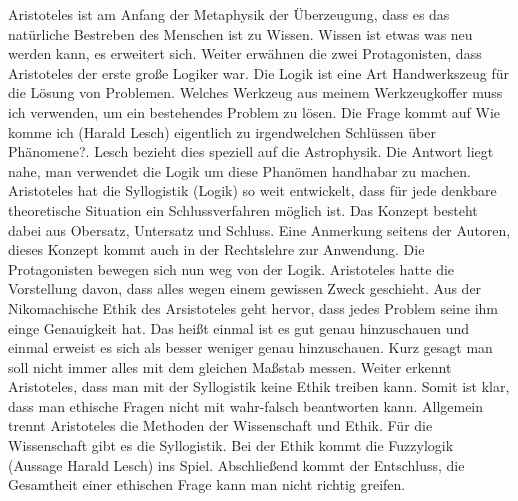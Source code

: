 Aristoteles ist am Anfang der Metaphysik der Überzeugung, dass es das natürliche Bestreben des Menschen ist zu Wissen. Wissen ist etwas was neu werden kann, es erweitert sich. Weiter erwähnen die zwei Protagonisten, dass Aristoteles der erste große Logiker war. Die Logik ist eine Art Handwerkszeug für die Lösung von Problemen. Welches Werkzeug aus meinem Werkzeugkoffer muss ich verwenden, um ein bestehendes Problem zu lösen. Die Frage kommt auf \glqq Wie komme ich (Harald Lesch) eigentlich zu irgendwelchen Schlüssen über Phänomene?\grqq. Lesch bezieht dies speziell auf die Astrophysik. Die Antwort liegt nahe, man verwendet die Logik um diese Phanömen handhabar zu machen. Aristoteles hat die Syllogistik (Logik) so weit entwickelt, dass für jede denkbare theoretische Situation ein Schlussverfahren möglich ist. Das Konzept besteht dabei aus Obersatz, Untersatz und Schluss. Eine Anmerkung seitens der Autoren, dieses Konzept kommt auch in der Rechtslehre zur Anwendung. Die Protagonisten bewegen sich nun weg von der Logik. Aristoteles hatte die Vorstellung davon, dass alles wegen einem gewissen Zweck geschieht. Aus der Nikomachische Ethik des Arsistoteles geht hervor, dass jedes Problem seine ihm einge Genauigkeit hat. Das heißt einmal ist es gut genau hinzuschauen und einmal erweist es sich als besser weniger genau hinzuschauen. Kurz gesagt man soll nicht immer alles mit dem gleichen Maßstab messen. Weiter erkennt Aristoteles, dass man mit der Syllogistik keine Ethik treiben kann. Somit ist klar, dass man ethische Fragen nicht mit wahr-falsch beantworten kann. Allgemein trennt Aristoteles die Methoden der Wissenschaft und Ethik. Für die Wissenschaft gibt es die Syllogistik. Bei der Ethik kommt die Fuzzylogik (Aussage Harald Lesch) ins Spiel. Abschließend kommt der Entschluss, die Gesamtheit einer ethischen Frage kann man nicht richtig greifen. 

